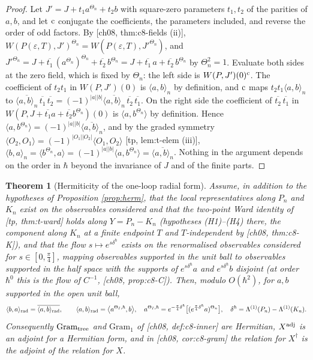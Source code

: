 \documentclass[11pt]{article}
\theoremstyle{plain}
\newtheorem{theorem}{Theorem}[section]
\theoremstyle{definition}
\numberwithin{equation}{section}
\newcommand{\TP}[2]{\big\langle #1,#2\big\rangle}
\newcommand{\Gt}{\mathrm{Gram}_{\rm tree}}
\newcommand{\Go}{\mathrm{Gram}_1}
\begin{document}
\begin{proof}
Let $J'=J+t_1a^{\Theta_n}+t_2b$ with square-zero parameters $t_1,t_2$ of the parities of $a,b$, and let ${\rm c}$ conjugate the coefficients, the parameters included, and reverse the order of odd factors. By [ch08, thm:c8-fields (ii)], $W(P(\varepsilon,T),J')^{\Theta_n}=W(P(\varepsilon,T),J'^{\Theta_n})$, and $J'^{\Theta_n}=J+\overline{t_1}\,(a^{\Theta_n})^{\Theta_n}+\overline{t_2}\,b^{\Theta_n}=J+\overline{t_1}\,a+\overline{t_2}\,b^{\Theta_n}$ by $\Theta_n^2=1$. Evaluate both sides at the zero field, which is fixed by $\Theta_n$: the left side is $W(P,J')(0)^{\rm c}$. The coefficient of $t_2t_1$ in $W(P,J')(0)$ is $\langle a,b\rangle_n$ by definition, and ${\rm c}$ maps $t_2t_1\langle a,b\rangle_n$ to $\overline{\langle a,b\rangle_n}\,\overline{t_1}\,\overline{t_2}=(-1)^{|a||b|}\overline{\langle a,b\rangle_n}\,\overline{t_2}\,\overline{t_1}$. On the right side the coefficient of $\overline{t_2}\,\overline{t_1}$ in $W(P,J+\overline{t_1}a+\overline{t_2}b^{\Theta_n})(0)$ is $\TP{a}{b^{\Theta_n}}$ by definition. Hence $\TP{a}{b^{\Theta_n}}=(-1)^{|a||b|}\overline{\langle a,b\rangle_n}$, and by the graded symmetry $\TP{O_2}{O_1}=(-1)^{|O_1||O_2|}\TP{O_1}{O_2}$ [tp, lem:t-elem (iii)], $\langle b,a\rangle_n=\TP{b^{\Theta_n}}{a}=(-1)^{|a||b|}\TP{a}{b^{\Theta_n}}=\overline{\langle a,b\rangle_n}$. Nothing in the argument depends on the order in $\hbar$ beyond the invariance of $J$ and of the finite parts.
\end{proof}

\begin{theorem}[Hermiticity of the one-loop radial form]
\label{thm:hermrad}
Assume, in addition to the hypotheses of Proposition \ref{prop:herm}, that the local representatives along $P_n$ and $K_n$ exist on the observables considered and that the two-point Ward identity of [tp, thm:t-ward] holds along $Y=P_n-K_n$ (hypotheses (H1)--(H4) there, the component along $K_n$ at a finite endpoint $T$ and $T$-independent by [ch08, thm:c8-K]), and that the flow $s\mapsto e^{s\delta^\hbar}$ exists on the renormalised observables considered for $s\in[0,\tfrac\pi4]$, mapping observables supported in the unit ball to observables supported in the half space with the supports of $e^{s\delta^\hbar}a$ and $e^{s\delta^\hbar}b$ disjoint (at order $\hbar^0$ this is the flow of $C^{-1}$, [ch08, prop:c8-C]). Then, modulo $O(\hbar^2)$, for $a,b$ supported in the open unit ball,
\[
\langle b,a\rangle_{\rm rad}=\overline{\langle a,b\rangle_{\rm rad}},\qquad \langle a,b\rangle_{\rm rad}=\TP{a^{\Theta_I,\hbar}}{b},\quad a^{\Theta_I,\hbar}=e^{-\frac\pi4\delta^\hbar}\big[(e^{\frac\pi4\delta^\hbar}a)^{\Theta_n}\big],\quad \delta^\hbar=\Lambda^{(1)}(P_n)-\Lambda^{(1)}(K_n).
\]
Consequently $\Gt$ and $\Go$ of [ch08, def:c8-inner] are Hermitian, $X^{\rm adj}$ is an adjoint for a Hermitian form, and in [ch08, cor:c8-gram] the relation for $X^\dagger$ is the adjoint of the relation for $X$.
\end{theorem}
\end{document}
